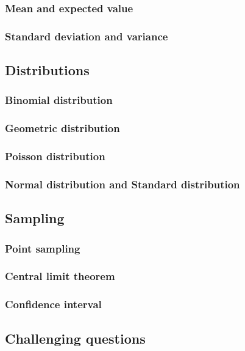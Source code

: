 \documentclass[12pt]{article}
\begin{document}
    \subsubsection*{Mean and expected value}

    \subsubsection*{Standard deviation and variance}

    \subsection{Distributions}

    \subsubsection*{Binomial distribution}

    \subsubsection*{Geometric distribution}

    \subsubsection*{Poisson distribution}

    \subsubsection*{Normal distribution and Standard distribution}

    \subsection{Sampling}

    \subsubsection*{Point sampling}

    \subsubsection*{Central limit theorem}

    \subsubsection*{Confidence interval}

    \subsection{Challenging questions}
\end{document}
